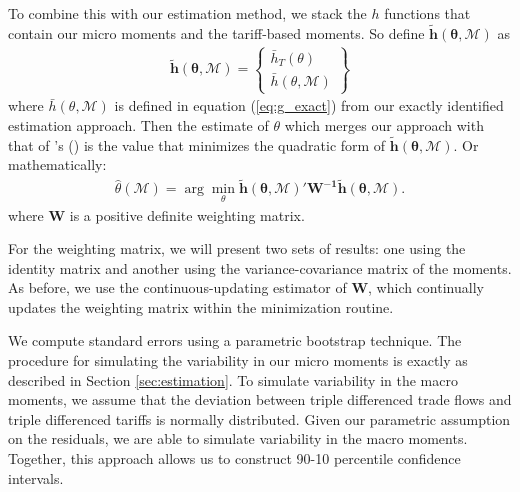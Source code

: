 \documentclass[12pt,dvips, ps2pdf]{article}
\def\citeapos#1{\citeauthor{#1}'s (\citeyear{#1})}
\begin{document}
To combine this with our estimation method, we stack the $h$ functions that contain our micro moments and the tariff-based moments. So define $\mathbf{\tilde h(\theta, \mathcal{M})}$ as
\begin{align}
\mathbf{\tilde h(\theta, \mathcal{M})} = \left \{ \begin{array}{c} \bar{h}_T(\theta) \\
\bar{h}(\theta, \mathcal{M})
\end{array} \right \}
\end{align}
where $\bar{h}(\theta, \mathcal{M})$ is defined in equation (\ref{eq:g_exact}) from our exactly identified estimation approach. Then the estimate of $\theta$ which merges our approach with that of \citeapos{caliendo2010} is the value that minimizes the quadratic form of $\mathbf{\tilde h(\theta, \mathcal{M})}$. Or mathematically:
\begin{align}
\hat \theta (\mathcal{M}) = \arg\min_{\theta} \mathbf{\tilde h(\theta, \mathcal{M})}'\mathbf{W^{-1}}\mathbf{\tilde h(\theta, \mathcal{M})}.
\label{eq:macromicro_quadform}
\end{align}
where $\mathbf{W}$ is a positive definite weighting matrix.

For the weighting matrix, we will present two sets of results: one using the identity matrix and another using the variance-covariance matrix of the moments. As before, we use the continuous-updating estimator of $\mathbf{W}$, which continually updates the weighting matrix within the minimization routine.

We compute standard errors using a parametric bootstrap technique. The procedure for simulating the variability in our micro moments is exactly as described in Section \ref{sec:estimation}. To simulate variability in the macro moments, we assume that the deviation between triple differenced trade flows and triple differenced tariffs is normally distributed. Given our parametric assumption on the residuals, we are able to simulate variability in the macro moments. Together, this approach allows us to construct 90-10 percentile confidence intervals.
\end{document}
